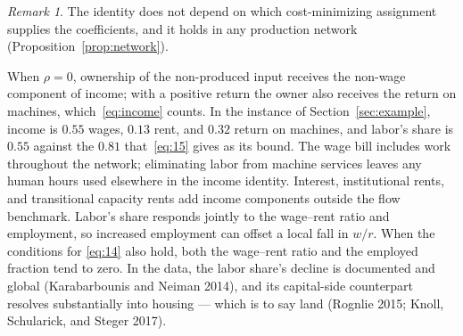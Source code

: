 \documentclass[12pt]{article}
\theoremstyle{plain}
\theoremstyle{definition}
\theoremstyle{remark}
\newtheorem*{remark}{Remark}
\begin{document}
\begin{remark}
The identity does not depend on which cost-minimizing assignment supplies the coefficients, and it holds in any production network (Proposition~\ref{prop:network}).
\end{remark}

When $\rho=0$, ownership of the non-produced input receives the non-wage component of income; with a positive return the owner also receives the return on machines, which~\eqref{eq:income} counts.
In the instance of Section~\ref{sec:example}, income is $0.55$ wages, $0.13$ rent, and $0.32$ return on machines, and labor's share is $0.55$ against the $0.81$ that~\eqref{eq:15} gives as its bound.
The wage bill includes work throughout the network; eliminating labor from machine services leaves any human hours used elsewhere in the income identity. Interest, institutional rents, and transitional capacity rents add income components outside the flow benchmark. Labor's share responds jointly to the wage--rent ratio and employment, so increased employment can offset a local fall in $w/r$. When the conditions for \eqref{eq:14} also hold, both the wage--rent ratio and the employed fraction tend to zero.
In the data, the labor share's decline is documented and global (Karabarbounis and Neiman 2014), and its capital-side counterpart resolves substantially into housing --- which is to say land (Rognlie 2015; Knoll, Schularick, and Steger 2017).
\end{document}
